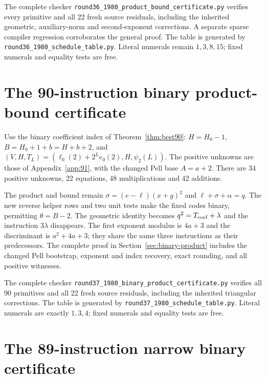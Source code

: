 \documentclass[11pt,letterpaper]{article}
\theoremstyle{definition}
\theoremstyle{remark}
\numberwithin{equation}{section}
\newcommand{\file}[1]{\texttt{#1}}
\begin{document}
The complete checker
\file{round36\_1980\_product\_bound\_certificate.py}
verifies every primitive and all 22 fresh source residuals, including
the inherited geometric, auxiliary-norm and second-exponent
corrections. A separate sparse compiler regression corroborates the
general proof. The table is generated by
\file{round36\_1980\_schedule\_table.py}. Literal numerals remain
$1,3,8,15$; fixed numerals and equality tests are free.

\small


\clearpage\normalsize
\section{The 90-instruction binary product-bound certificate}\label{app:90}

Use the binary coefficient index of Theorem~\ref{thm:best90}:
$H=H_0-1$, $B=H_0+1+b=H+b+2$, and
$(V,H,T_L)=(\ell_0(2)+2^Le_0(2),H,\psi_2(L))$.
The positive unknowns are those of Appendix~\ref{app:91}, with
the changed Pell base $A=a+2$. There are 34 positive unknowns,
22 equations, 48 multiplications and 42 additions.

The product and bound remain $\sigma=(e-\ell)(x+g)^2$ and
$\ell+\sigma+\alpha=q$. The new reverse helper rows and two unit
tests make the fixed codes binary, permitting $\theta=B-2$.
The geometric identity becomes $q^2=T_{\rm coef}+\lambda$ and
the instruction $3\lambda$ disappears. The first exponent modulus
is $4a+3$ and the discriminant is $a^2+4a+3$; they share the same
three instructions as their predecessors. The complete proof in
Section~\ref{sec:binary-product} includes the changed Pell bootstrap,
exponent and index recovery, exact rounding, and all positive witnesses.

The complete checker
\file{round37\_1980\_binary\_product\_certificate.py}
verifies all 90 primitives and all 22 fresh source residuals, including
the inherited triangular corrections. The table is generated by
\file{round37\_1980\_schedule\_table.py}. Literal numerals are exactly
$1,3,4$; fixed numerals and equality tests are free.

\small


\clearpage\normalsize
\section{The 89-instruction narrow binary certificate}\label{app:89}
\end{document}

